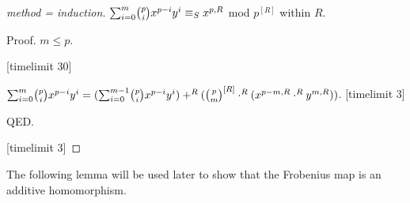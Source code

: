 \documentclass[11pt]{article}
\begin{document}
\begin{forthel}
\begin{proof}[method = induction]


$\binsum{m}{p}{x}{y}{R}  
\equiv_{S} x^{p,R} $ mod $p^{[R]}$ within $R$.

Proof. $m \leq p$. 

[timelimit 30]

$\binsum{m}{p}{x}{y}{R} = 
(\binsum{m-1}{p}{x}{y}{R}) +^{R} (\cho{p}{m}^{[R]} \cdot^{R} (x^{p - m,R} \cdot^{R} y^{m,R}))$.
[timelimit 3]

QED.

[timelimit 3]

\end{proof}
\end{forthel}
The following lemma will be used later to show that the Frobenius
map is an additive homomorphism.
\end{document}
